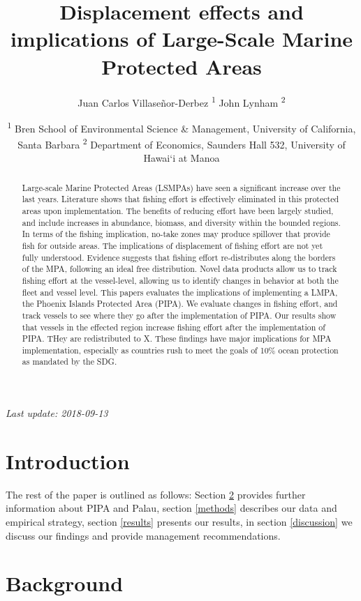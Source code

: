 \documentclass[]{article}
\title{Displacement effects and implications of Large-Scale Marine Protected
Areas}
\author{Juan Carlos Villaseñor-Derbez \textsuperscript{1} John Lynham
\textsuperscript{2}}
\date{\textsuperscript{1} Bren School of Environmental Science \& Management,
University of California, Santa Barbara \textsuperscript{2} Department
of Economics, Saunders Hall 532, University of Hawai`i at Manoa}
\theoremstyle{definition}
\theoremstyle{definition}
\theoremstyle{definition}
\theoremstyle{remark}
\begin{document}
\maketitle
\begin{abstract}
Large-scale Marine Protected Areas (LSMPAs) have seen a significant
increase over the last years. Literature shows that fishing effort is
effectively eliminated in this protected areas upon implementation. The
benefits of reducing effort have been largely studied, and include
increases in abundance, biomass, and diversity within the bounded
regions. In terms of the fishing implication, no-take zones may produce
spillover that provide fish for outside areas. The implications of
displacement of fishing effort are not yet fully understood. Evidence
suggests that fishing effort re-distributes along the borders of the
MPA, following an ideal free distribution. Novel data products allow us
to track fishing effort at the vessel-level, allowing us to identify
changes in behavior at both the fleet and vessel level. This papers
evaluates the implications of implementing a LMPA, the Phoenix Islands
Protected Area (PIPA). We evaluate changes in fishing effort, and track
vessels to see where they go after the implementation of PIPA. Our
results show that vessels in the effected region increase fishing effort
after the implementation of PIPA. THey are redistributed to X. These
findings have major implications for MPA implementation, especially as
countries rush to meet the goals of 10\% ocean protection as mandated by
the SDG.
\end{abstract}

{
\setcounter{tocdepth}{4}
\tableofcontents
}
\emph{Last update: 2018-09-13}

\section{Introduction}\label{introduction}

The rest of the paper is outlined as follows: Section \ref{background}
provides further information about PIPA and Palau, section \ref{methods}
describes our data and empirical strategy, section \ref{results}
presents our results, in section \ref{discussion} we discuss our
findings and provide management recommendations.

\section{Background}\label{background}
\end{document}
